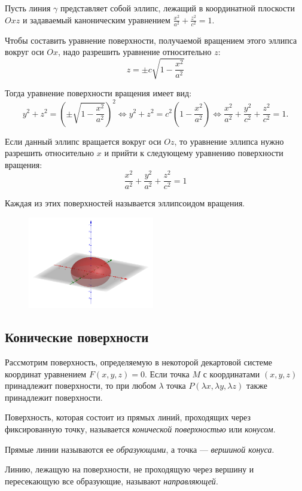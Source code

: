\begin{example}
  Пусть линия $\gamma$ представляет собой эллипс, лежащий в координатной плоскости $Oxz$ и задаваемый каноническим уравнением $\frac{x^2}{a^2} + \frac{z^2}{c^2} = 1$.

  Чтобы составить уравнение поверхности, получаемой вращением этого эллипса вокруг оси $Ox$, надо разрешить уравнение относительно $z$: $$
    z = \pm c \sqrt{1 - \frac{x^2}{a^2}}
  $$
  
  Тогда уравнение поверхности вращения имеет вид:$$
    y^2 + z^2 = (\pm \sqrt{1 - \frac{x^2}{a^2}})^2 \Leftrightarrow y^2 + z^2 = c^2(1 - \frac{x^2}{a^2}) \Leftrightarrow \frac{x^2}{a^2} + \frac{y^2}{c^2} + \frac{z^2}{c^2} = 1.
  $$

  Если данный эллипс вращается вокруг оси $Oz$, то уравнение эллипса нужно разрешить относительно
  $x$ и прийти к следующему уравнению поверхности вращения: $$
    \frac{x^2}{a^2} + \frac{y^2}{a^2} + \frac{z^2}{c^2} = 1
  $$
  
  Каждая из этих поверхностей называется эллипсоидом вращения.
  \begin{figure}[H]
    \centering
    \includegraphics[height = 4cm]{images/second_ellipsoid.png}
  \end{figure}
\end{example}

\subsection*{Конические поверхности}

Рассмотрим поверхность, определяемую в некоторой декартовой системе координат уравнением $F(x, y, z)=0$. Если точка $M$ с координатами
$(x, y, z)$ принадлежит поверхности, то при любом $\lambda$ точка $P(\lambda x, \lambda y, \lambda z)$ также принадлежит поверхности.
\begin{definition}
  Поверхность, которая состоит из прямых линий, проходящих через фиксированную точку, называется \textit{конической поверхностью} или \textit{конусом}. 
  
  Прямые линии называются ее \textit{образующими}, а точка — \textit{вершиной конуса}. 
  
  Линию, лежащую на поверхности, не проходящую
  через вершину и пересекающую все образующие, называют
  \textit{направляющей}.
\end{definition}

